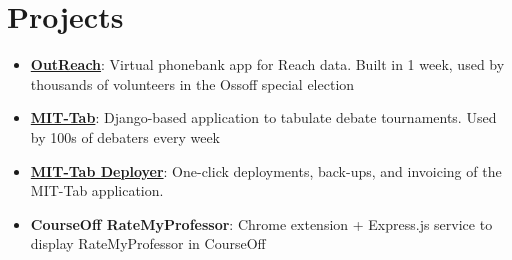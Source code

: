 \documentclass[letterpaper,11pt]{article}
\newcommand{\resumeItem}[2]{
  \item\small{
    \textbf{#1}{: #2 \vspace{-2pt}}
  }
}
\newcommand{\resumeSubItem}[2]{\resumeItem{#1}{#2}\vspace{-4pt}}
\newcommand{\resumeSubHeadingListStart}{\begin{itemize}[leftmargin=*]}
\newcommand{\resumeSubHeadingListEnd}{\end{itemize}}
\begin{document}
\section{Projects}
  \resumeSubHeadingListStart
    \resumeSubItem{\href{https://github.com/ossoffforsenate/OutReach}{OutReach}}
      {Virtual phonebank app for Reach data. Built in 1 week, used by thousands
       of volunteers in the Ossoff special election}
    \resumeSubItem{\href{https://github.com/mit-tab/mit-tab}{MIT-Tab}}
      {Django-based application to tabulate debate tournaments. Used by 100s of
      debaters every week}
    \resumeSubItem{\href{https://github.com/mit-tab/mittab-deploy}{MIT-Tab Deployer}}
      {One-click deployments, back-ups, and invoicing of the MIT-Tab application.}
    \resumeSubItem{CourseOff RateMyProfessor}
      {Chrome extension + Express.js service to display RateMyProfessor in CourseOff}
  \resumeSubHeadingListEnd


\end{document}
